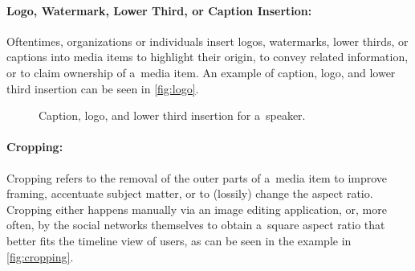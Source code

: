 \paragraph{Logo, Watermark, Lower Third, or Caption Insertion:}

Oftentimes, organizations or individuals insert
logos, watermarks, lower thirds, or captions into media items
to highlight their origin, to convey related information,
or to claim ownership of a~media item.
An example of caption, logo, and lower third insertion
can be seen in \autoref{fig:logo}.

\begin{figure}[h!]
  \centering
  \caption{Caption, logo, and lower third insertion for a~speaker.}
  \label{fig:logo}  
\end{figure}

\paragraph{Cropping:}

Cropping refers to the removal of the outer parts of a~media item
to improve framing, accentuate subject matter,
or to (lossily) change the aspect ratio.
Cropping either happens manually via an image editing application,
or, more often, by the social networks themselves
to obtain a~square aspect ratio
that better fits the timeline view of users,
as can be seen in the example in \autoref{fig:cropping}.

